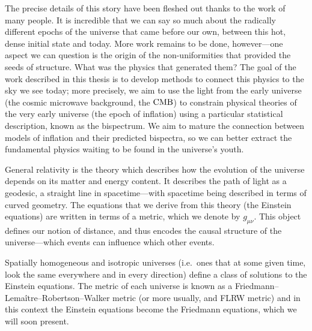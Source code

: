 The precise details of this story have been fleshed out thanks to the work of many people.
It is incredible that we can say so much about the radically different epochs of the universe that came before our own,
between this hot, dense initial state and today.
More work remains to be done, however---one aspect we can question is the origin of the non-uniformities
that provided the seeds of structure. What was the physics that generated them?
The goal of the work described in this thesis is to develop methods to connect this physics
to the sky we see today; more precisely, we aim to use the light from the early universe (the cosmic microwave
background, the $\text{CMB}$)
to constrain physical theories of the very early universe (the epoch of inflation) using a particular
statistical description, known as the bispectrum.
We aim to mature the connection between models of inflation and their predicted bispectra, so we can better
extract the fundamental physics waiting to be found in the universe's youth.


    General relativity is the theory which describes how the evolution of the universe depends
    on its matter and energy content. It describes the path of light as a geodesic, a straight line
    in spacetime---with spacetime being described in terms of curved geometry.
    The equations that we derive from this theory (the Einstein equations) are written in terms of a metric,
    which we denote by $g_{\mu\nu}$. This object defines our notion of distance, and thus encodes
    the causal structure of the universe---which events can influence which other events.
    

    Spatially homogeneous and isotropic universes (i.e.\ ones that at some given
    time, look the same everywhere and in every direction)
    define a class of solutions to the Einstein equations.
    The metric of each universe is known as a Friedmann–Lemaître–Robertson–Walker metric
    (or more usually, and FLRW metric) and in this context
    the Einstein equations become the Friedmann equations, which we will soon present.


